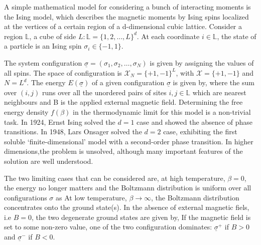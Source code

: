 \documentclass[letterpaper,english,12pt]{article}
\begin{document}
A simple mathematical model for considering a bunch of interacting moments is the Ising model, which describes the magnetic moments by Ising spins localized at the vertices of a certain region of a d-dimensional cubic lattice. Consider a region $\mathbb{L}$, a cube of side $L:\mathbb{L}=\{1,2, \dots, L\}^d$. At each coordinate $i \in \mathbb{L}$, the state of a particle is an Ising spin $\sigma_i \in \{-1,1\}$.


The system configuration $\underline{\sigma} = (\sigma_1, \sigma_2, \dots, \sigma_N)$ is given by assigning the values of all spins. The space of configuration is $\mathcal{X}_N = \{+1,-1\}^L$, with $\mathcal{X}= \{+1,-1\}$ and $N=L^d$.
The energy $E(\underline{\sigma})$ of a given configuration $\underline{\sigma}$ is given by,
where the sum over $(i,j)$ runs over all the unordered pairs of sites $i,j \in \mathbb{L}$ which are nearest neighbours and B is the applied external magnetic field.
Determining the free energy density $f(\beta)$ in the thermodynamic limit for this model is a non-trivial task. In 1924, Ernst Ising solved the $d=1$ case and showed the absence of phase transitions. In 1948, Lars Onsager solved the $d=2$ case, exhibiting the first soluble ‘finite-dimensional’ model with a second-order phase transition. In higher dimensions,the problem is unsolved, although many important features of the solution are well understood.

The two limiting cases that can be considered are, at high temperature, $\beta=0$, the energy no longer matters and the Boltzmann distribution is uniform over all configurations $\sigma$ as
At low temperature, $\beta \rightarrow \infty$, the Boltzmann distribution concentrates onto the ground state(s). In the absence of external magnetic fiels, i.e $B=0$, the two degenerate ground states are given by,
If the magnetic field is set to some non-zero value, one of the two configuration dominates: $\underline{\sigma}^+$ if $B>0$ and $\underline{\sigma}^-$ if $B<0$.
\end{document}
